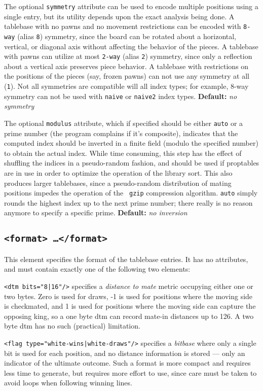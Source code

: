 \documentclass[11pt]{article}
\begin{document}
The optional {\tt symmetry} attribute can be used to encode multiple
positions using a single entry, but its utility depends upon the exact
analysis being done.  A tablebase with no pawns and no movement
restrictions can be encoded with {\tt 8-way} (alias {\tt 8}) symmetry,
since the board can be rotated about a horizontal, vertical, or
diagonal axis without affecting the behavior of the pieces.  A
tablebase with pawns can utilize at most {\tt 2-way} (alias {\tt 2})
symmetry, since only a reflection about a vertical axis preserves
piece behavior.  A tablebase with restrictions on the positions of the
pieces (say, frozen pawns) can not use any symmetry at all ({\tt 1}).
Not all symmetries are compatible will all index types; for example,
8-way symmetry can not be used with {\tt naive} or {\tt naive2}
index types.
{\bf Default:} {\it no symmetry}

The optional {\tt modulus} attribute, which if specified should be
either {\tt auto} or a prime number (the program complains if it's
composite), indicates that the computed index should be inverted in a
finite field (modulo the specified number) to obtain the actual index.
While time consuming, this step has the effect of shuffling the
indices in a pseudo-random fashion, and should be used if proptables
are in use in order to optimize the operation of the library sort.
This also produces larger tablebases, since a pseudo-random
distribution of mating positions impedes the operation of the {\tt
gzip} compression algorithm.  {\tt auto} simply rounds the highest
index up to the next prime number; there really is no reason anymore
to specify a specific prime.
{\bf Default:} {\it no inversion}

\subsection{\tt <format> \ldots\quad </format>}

This element specifies the format of the tablebase entries.  It has no
attributes, and must contain exactly one of the following two
elements:

{\tt <dtm bits="8|16"/>} specifies a {\it distance to mate} metric
occupying either one or two bytes.  Zero is used for draws, -1 is used
for positions where the moving side is checkmated, and 1 is used for
positions where the moving side can capture the opposing king, so a
one byte dtm can record mate-in distances up to 126.  A two byte dtm
has no such (practical) limitation.

{\tt <flag type="white-wins|white-draws"/>} specifies a {\it bitbase}
where only a single bit is used for each position, and no distance
information is stored --- only an indicator of the ultimate outcome.
Such a format is more compact and requires less time to generate, but
requires more effort to use, since care must be taken to avoid loops
when following winning lines.
\end{document}
